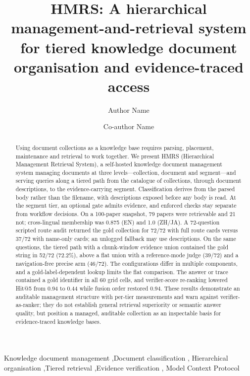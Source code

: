 \documentclass[final,5p,times,twocolumn]{elsarticle}
\begin{document}
\begin{frontmatter}

\title{HMRS: A hierarchical management-and-retrieval system for tiered
knowledge document organisation and evidence-traced access}

\author[inst1]{Author Name}
\author[inst1]{Co-author Name}

\begin{abstract}
Using document collections as a knowledge base requires parsing, placement,
maintenance and retrieval to work together. We present HMRS (Hierarchical
Management Retrieval System), a self-hosted knowledge document management
system managing documents at three levels---collection, document and
segment---and serving queries along a tiered path from the catalogue of
collections, through document descriptions, to the evidence-carrying segment.
Classification derives from the parsed body rather than the filename, with
descriptions exposed before any body is read. At the segment tier, an
optional gate admits evidence, and enforced checks stay separate from
workflow decisions.
On a 100-paper snapshot, 79 papers were retrievable and 21 not; cross-lingual
membership was 0.875 (EN) and 1.0 (ZH/JA). A 72-question scripted route audit
returned the gold collection for 72/72 with full route cards versus 37/72
with name-only cards; an unlogged fallback may use descriptions. On the same
questions, the tiered path with a chunk-window evidence union contained the
gold string in 52/72 (72.2\%), above a flat union with a reference-mode judge
(39/72) and a navigation-free precise arm (46/72). The configurations differ
in multiple components, and a gold-label-dependent lookup limits the flat
comparison. The answer or trace contained a gold identifier in all 60 grid
cells, and verifier-score re-ranking lowered Hit@5 from 0.94 to 0.44 while
fusion order restored 0.94. These results demonstrate an auditable management
structure with per-tier measurements and warn against verifier-as-ranker;
they do not establish general retrieval superiority or semantic answer
quality, but position a managed, auditable collection as an inspectable basis
for evidence-traced knowledge bases.
\end{abstract}

\begin{keyword}
Knowledge document management \sep Document classification \sep
Hierarchical organisation \sep Tiered retrieval \sep Evidence verification \sep
Model Context Protocol
\end{keyword}

\end{frontmatter}
\end{document}
